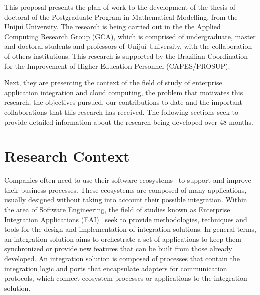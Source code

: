 This proposal presents the plan of work to the development of the thesis of doctoral of the Postgraduate Program in Mathematical Modelling, from the Unijuí University. The research is being carried out in the the Applied Computing Research Group (GCA), which is comprised of undergraduate, master and doctoral students and professors of Unijuí University, with the collaboration of others institutions. This research is supported by the Brazilian Coordination for the Improvement of Higher Education Personnel (CAPES/PROSUP).

Next, they are presenting the context of the field of study of enterprise application integration and cloud computing, the problem that motivates this research, the objectives pursued, our contributions to date and the important collaborations that this research has received. The following sections seek to provide detailed information about the research being developed over 48 months.
\section{Research Context}

\noindent 
Companies often need to use their software ecosystems~\cite{messerschmitt:2005} to support and improve their business processes. These ecosystems are composed of many applications, usually designed without taking into account their possible integration. Within the area of Software Engineering, the field of studies known as Enterprise Integration Applications (EAI)~\cite{frantz2016} seek to provide methodologies, techniques and tools for the design and implementation of integration solutions. In general terms, an integration solution aims to orchestrate a set of applications to keep them synchronized or provide new features that can be built from those already developed. An integration solution is composed of processes that contain the integration logic and ports that encapsulate adapters for communication protocols, which connect ecosystem processes or applications to the integration solution.


